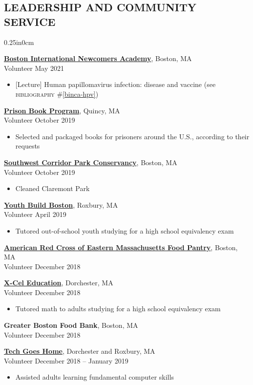 \documentclass[11pt]{article}
\newcommand{\mysec}[1]{\subsection*{\uppercase{#1}}}
\newcommand{\blockindent}{0.25in}
\newcommand{\job}[4]{
\textbf{#1}, {#2} \\
{#3} \hfill {#4}\\
}
\begin{document}
\mysec{Leadership and Community Service}
\begin{adjustwidth}{\blockindent}{0cm}

\job{\href{https://www.bincabps.org/}{Boston International Newcomers Academy}}{Boston, MA}{Volunteer}{May 2021}
\begin{itemize}
	\item {[Lecture]} Human papillomavirus infection: disease and vaccine (see \textsc{bibliography} \#\ref{binca-hpv})
\end{itemize}

\job{\href{http://www.prisonbookprogram.org}{Prison Book Program}}{Quincy, MA}{Volunteer}{October 2019}
\begin{itemize}
	\item Selected and packaged books for prisoners around the U.S., according to their requests
\end{itemize}

\job{\href{http://www.swcpc.org}{Southwest Corridor Park Conservancy}}{Boston, MA}{Volunteer}{October 2019}
\begin{itemize}
	\item Cleaned Claremont Park
\end{itemize}

\job{\href{http://www.youthbuildboston.org/}{Youth Build Boston}}{Roxbury, MA}{Volunteer}{April 2019}
\begin{itemize}
	\item Tutored out-of-school youth studying for a high school equivalency exam
\end{itemize}

\job{\href{http://www.redcross.org/local/massachusetts}{American Red Cross of Eastern Massachusetts Food Pantry}}{Boston, MA}{Volunteer}{December 2018}
\vspace{12pt}

\job{\href{http://www.x-celeducation.org/}{X-Cel Education}}{Dorchester, MA}{Volunteer}{December 2018}
\begin{itemize}
	\item Tutored math to adults studying for a high school equivalency exam
\end{itemize}

\job{Greater Boston Food Bank}{Boston, MA}{Volunteer}{December 2018}
\vspace{12pt}

\job{\href{https://www.techgoeshome.org/}{Tech Goes Home}}{Dorchester and Roxbury, MA}{Volunteer}{December 2018 -- January 2019}
\begin{itemize}
	\item Assisted adults learning fundamental computer skills
\end{itemize}


\end{adjustwidth}
\end{document}
